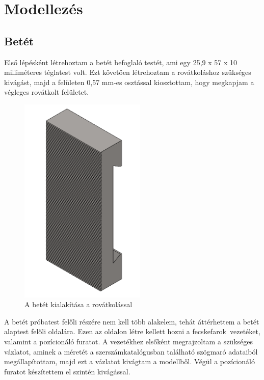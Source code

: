 \documentclass[12pt,a4paper,oneside]{report}
\begin{document}
\section{Modellezés}
\subsection{Betét}
Első lépésként létrehoztam a betét befoglaló testét, ami egy 25,9 x 57 x 10 milliméteres téglatest volt. Ezt követően létrehoztam a rovátkoláshoz szükséges kivágást, majd a felületen 0,57 mm-es osztással kiosztottam, hogy megkapjam a végleges rovátkolt felületet.
\begin{figure}[H]
\centering
\includegraphics[width=6cm]{figures/betet_rovatkolas}
\caption{A betét kialakítása a rovátkolással}
\label{Fig:betet_rovatkolas}
\end{figure}

A betét próbatest felőli részére nem kell több alakelem, tehát áttérhettem a betét alaptest felőli oldalára. Ezen az oldalon létre kellett hozni a \glqq fecskefarok\grqq\ vezetéket, valamint a pozícionáló furatot. A vezetékhez elsőként megrajzoltam a szükséges vázlatot, aminek a méretét a szerszámkatalógusban található szögmaró adataiból megállapítottam, majd ezt a vázlatot kivágtam a modellből. Végül a pozícionáló furatot készítettem el szintén kivágással.
\end{document}
